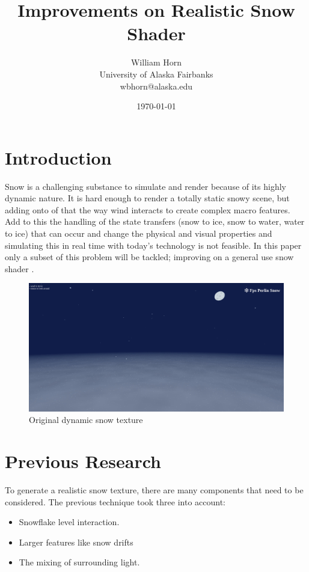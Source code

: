 \documentclass{IEEEtran}
\begin{document}
\title{Improvements on Realistic Snow Shader}
\author{William Horn\\University of Alaska Fairbanks\\wbhorn@alaska.edu}
\date{\today}
\maketitle

\section{Introduction}

Snow is a challenging substance to simulate and render because of its highly
dynamic nature. It is hard enough to render a totally static snowy scene, but
adding onto of that the way wind interacts to create complex macro features. Add
to this the handling of the state transfers (snow to ice, snow to water, water
to ice) that can occur and change the physical and visual properties and
simulating this in real time with today's technology is not feasible. In this
paper only a subset of this problem will be tackled; improving on a general use snow
shader .

\begin{figure}
    \includegraphics[width=\linewidth]{images/original.jpg}
    \caption{Original dynamic snow texture}
    \label{fig:original}
\end{figure}

\section{Previous Research}

To generate a realistic snow texture, there are many components that need to be
considered. The previous technique took three into account:
\begin{itemize}
    \item Snowflake level interaction.
    \item Larger features like snow drifts
    \item The mixing of surrounding light.
\end{itemize}
\end{document}
